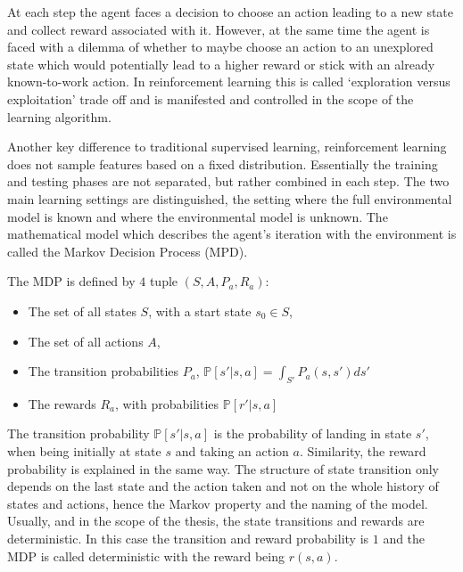 At each step the agent faces a decision to choose an action leading to a new
state and collect reward associated with it. However, at the same time the
agent is faced with a dilemma of whether to maybe choose an action to an
unexplored state which would potentially lead to a higher reward or stick
with an already known-to-work action. In reinforcement learning this
is called `exploration versus exploitation' trade off and is manifested and
controlled in the scope of the learning algorithm.

Another key difference to traditional supervised learning, reinforcement
learning does not sample features based on a fixed distribution. Essentially
the training and testing phases are not separated, but rather combined in
each step. The two main learning settings are distinguished, the setting
where the full environmental model is known and where the environmental model
is unknown. The mathematical model which describes the agent's iteration with
the environment is called the Markov Decision Process (MPD).
\begin{definition}
    The MDP is defined by $4$ tuple $(S, A, P_a, R_a)$:
    \begin{itemize}[nosep]
        \item The set of all states $S$, with a start state $s_0 \in S$,
        \item The set of all actions $A$,
        \item The transition probabilities $P_a$, $\mathbb{P}[s'|s, a] = \int_{S'}
            P_a(s, s') ds'$
        \item The rewards $R_a$, with probabilities $\mathbb{P}[r'|s, a]$
    \end{itemize}
\end{definition}
The transition probability $\mathbb{P}[s'|s, a]$ is the probability of
landing in state $s'$, when being initially at state $s$ and taking an action
$a$. Similarity, the reward probability is explained in the same way. The
structure of state transition only depends on the last state and the action
taken and not on the whole history of states and actions, hence the Markov
property and the naming of the model. Usually, and in the scope of the
thesis, the state transitions and rewards are deterministic. In this case the
transition and reward probability is $1$ and the MDP is called deterministic
with the reward being $r(s, a)$.
\newpage
